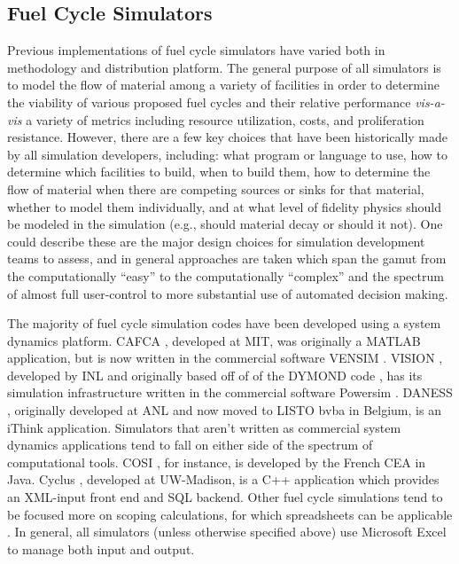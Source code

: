 \subsection{Fuel Cycle Simulators}

Previous implementations of fuel cycle simulators have varied both in
methodology and distribution platform. The general purpose of all simulators is
to model the flow of material among a variety of facilities in order to
determine the viability of various proposed fuel cycles and their relative
performance \textit{vis-a-vis} a variety of metrics including resource
utilization, costs, and proliferation resistance. However, there are a few key
choices that have been historically made by all simulation developers,
including: what program or language to use, how to determine which facilities to
build, when to build them, how to determine the flow of material when there are
competing sources or sinks for that material, whether to model them
individually, and at what level of fidelity physics should be modeled in the
simulation (e.g., should material decay or should it not). One could describe
these are the major design choices for simulation development teams to assess,
and in general approaches are taken which span the gamut from the
computationally ``easy'' to the computationally ``complex'' and the spectrum of
almost full user-control to more substantial use of automated decision making.

The majority of fuel cycle simulation codes have been developed using a system
dynamics platform. CAFCA \cite{guerin_impact_2009}, developed at MIT, was
originally a MATLAB application, but is now written in the commercial software
VENSIM \cite{vensim_2010_ventana}. VISION \cite{jacobson_verifiable_2010},
developed by INL and originally based off of of the DYMOND
code \cite{moisseytsev_dymond_2001}, has its simulation infrastructure written
in the commercial software Powersim \cite{studio_powersim_2003}.
DANESS \cite{van_den_durpel_daness_2009}, originally developed at ANL and now
moved to LISTO bvba in Belgium, is an iThink \cite{richmond_ithink_2004}
application. Simulators that aren't written as commercial system dynamics
applications tend to fall on either side of the spectrum of computational
tools. COSI \cite{boucher_cosi_2005}, for instance, is developed by the French
CEA in Java. Cyclus \cite{cyclus2012}, developed at UW-Madison, is a C++
application which provides an XML-input front end and SQL backend. Other fuel
cycle simulations tend to be focused more on scoping calculations, for which
spreadsheets can be applicable \cite{brudieu_evaluation_2011}. In general, all
simulators (unless otherwise specified above) use Microsoft Excel to manage both
input and output.

